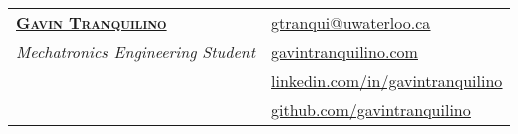 \documentclass[letterpaper]{article}
\begin{document}
\linespread{1.3}




\begin{center}
    \begin{tabularx}{\textwidth}{@{}X X@{}}
        \textbf{\Huge \scshape \href{https://www.gavintranquilino.com}{Gavin Tranquilino}} &
        \textbf{\hfill} \href{mailto:gtranqui@uwaterloo.ca}{\underline{gtranqui@uwaterloo.ca}}                                                                                                             \\
        \textit{\Large Mechatronics Engineering Student}                                   
        & \textbf{\hfill} \href{https://www.gavintranquilino.com}{\underline{gavintranquilino.com}}                     \\
        & \textbf{\hfill} \href{https://linkedin.com/in/gavintranquilino}{\underline{linkedin.com/in/gavintranquilino}} \\
        & \textbf{\hfill} \href{https://github.com/gavintranquilino}{\underline{github.com/gavintranquilino}} \end{tabularx} \end{center}
\end{document}
